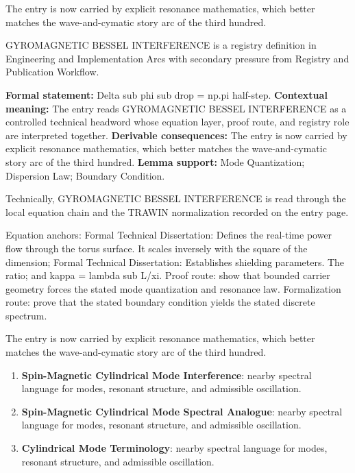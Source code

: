 The entry is now carried by explicit resonance mathematics, which better matches the wave-and-cymatic story arc of the third hundred.
\clearpage


\begingroup\small
{}
GYROMAGNETIC BESSEL INTERFERENCE is a registry definition in Engineering and Implementation Arcs with secondary pressure from Registry and Publication Workflow.

\begingroup\footnotesize\setlength{\emergencystretch}{3em}\sloppy
\textbf{Formal statement:} Delta sub phi sub drop = np.pi half-step. \textbf{Contextual meaning:} The entry reads GYROMAGNETIC BESSEL INTERFERENCE as a controlled technical headword whose equation layer, proof route, and registry role are interpreted together. \textbf{Derivable consequences:} The entry is now carried by explicit resonance mathematics, which better matches the wave-and-cymatic story arc of the third hundred. \textbf{Lemma support:} Mode Quantization; Dispersion Law; Boundary Condition.\par
\endgroup

Technically, GYROMAGNETIC BESSEL INTERFERENCE is read through the local equation chain and the TRAWIN normalization recorded on the entry page.

Equation anchors: Formal Technical Dissertation: Defines the real-time power flow through the torus surface. It scales inversely with the square of the dimension; Formal Technical Dissertation: Establishes shielding parameters. The ratio; and kappa = lambda sub L/xi. Proof route: show that bounded carrier geometry forces the stated mode quantization and resonance law. Formalization route: prove that the stated boundary condition yields the stated discrete spectrum.

The entry is now carried by explicit resonance mathematics, which better matches the wave-and-cymatic story arc of the third hundred.
\endgroup

\begin{enumerate}[leftmargin=1.6em,itemsep=6pt,topsep=4pt]
\item \textbf{Spin-Magnetic Cylindrical Mode Interference}: nearby spectral language for modes, resonant structure, and admissible oscillation.
\item \textbf{Spin-Magnetic Cylindrical Mode Spectral Analogue}: nearby spectral language for modes, resonant structure, and admissible oscillation.
\item \textbf{Cylindrical Mode Terminology}: nearby spectral language for modes, resonant structure, and admissible oscillation.
\end{enumerate}

